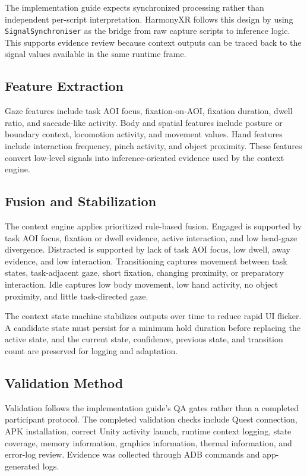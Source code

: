 \documentclass[conference]{IEEEtran}
\begin{document}
The implementation guide expects synchronized processing rather than independent per-script interpretation. HarmonyXR follows this design by using \texttt{SignalSynchroniser} as the bridge from raw capture scripts to inference logic. This supports evidence review because context outputs can be traced back to the signal values available in the same runtime frame.

\subsection{Feature Extraction}
Gaze features include task AOI focus, fixation-on-AOI, fixation duration, dwell ratio, and saccade-like activity. Body and spatial features include posture or boundary context, locomotion activity, and movement values. Hand features include interaction frequency, pinch activity, and object proximity. These features convert low-level signals into inference-oriented evidence used by the context engine.

\subsection{Fusion and Stabilization}
The context engine applies prioritized rule-based fusion. Engaged is supported by task AOI focus, fixation or dwell evidence, active interaction, and low head-gaze divergence. Distracted is supported by lack of task AOI focus, low dwell, away evidence, and low interaction. Transitioning captures movement between task states, task-adjacent gaze, short fixation, changing proximity, or preparatory interaction. Idle captures low body movement, low hand activity, no object proximity, and little task-directed gaze.

The context state machine stabilizes outputs over time to reduce rapid UI flicker. A candidate state must persist for a minimum hold duration before replacing the active state, and the current state, confidence, previous state, and transition count are preserved for logging and adaptation.

\subsection{Validation Method}
Validation follows the implementation guide's QA gates rather than a completed participant protocol. The completed validation checks include Quest connection, APK installation, correct Unity activity launch, runtime context logging, state coverage, memory information, graphics information, thermal information, and error-log review. Evidence was collected through ADB commands and app-generated logs.
\end{document}
